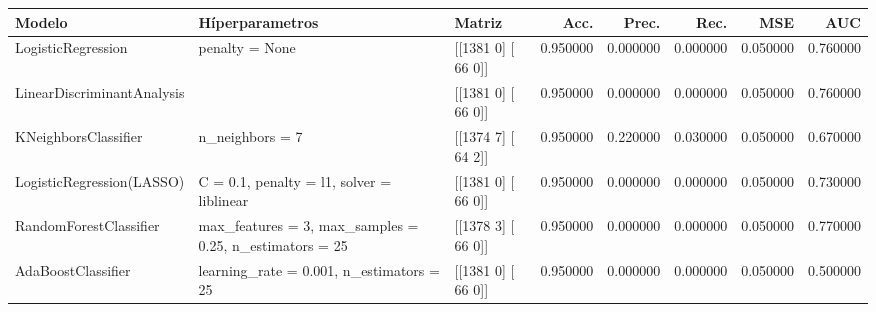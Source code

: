 \begin{tabular}{lllrrrrr}
\toprule
Modelo & Híperparametros & Matriz & Acc. & Prec. & Rec. & MSE & AUC \\
\midrule
LogisticRegression & penalty = None & [[1381    0]
 [  66    0]] & 0.950000 & 0.000000 & 0.000000 & 0.050000 & 0.760000 \\
LinearDiscriminantAnalysis &  & [[1381    0]
 [  66    0]] & 0.950000 & 0.000000 & 0.000000 & 0.050000 & 0.760000 \\
KNeighborsClassifier & n_neighbors = 7 & [[1374    7]
 [  64    2]] & 0.950000 & 0.220000 & 0.030000 & 0.050000 & 0.670000 \\
LogisticRegression(LASSO) & C = 0.1, penalty = l1, solver = liblinear & [[1381    0]
 [  66    0]] & 0.950000 & 0.000000 & 0.000000 & 0.050000 & 0.730000 \\
RandomForestClassifier & max_features = 3, max_samples = 0.25, n_estimators = 25 & [[1378    3]
 [  66    0]] & 0.950000 & 0.000000 & 0.000000 & 0.050000 & 0.770000 \\
AdaBoostClassifier & learning_rate = 0.001, n_estimators = 25 & [[1381    0]
 [  66    0]] & 0.950000 & 0.000000 & 0.000000 & 0.050000 & 0.500000 \\
\bottomrule
\end{tabular}
